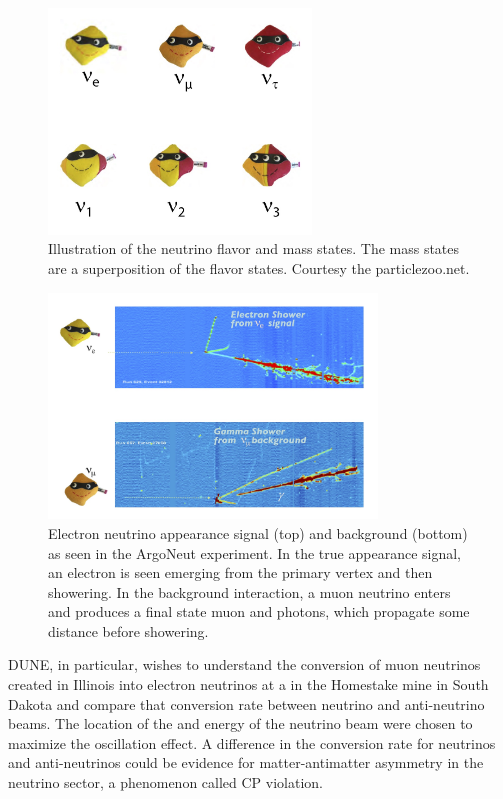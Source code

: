 \begin{figure}[h]
    \centering
\includegraphics[height=6cm]{graphics/IntroFigures/Fig_01_neutrinos.jpg}
    \caption{Illustration of the neutrino flavor and mass states.  The mass states are a superposition of the flavor states.  Courtesy the particlezoo.net.}
    \label{fig:neutrinos}
\end{figure}

\begin{figure}[h]
    \centering
\includegraphics[trim={0cm 0.6cm 2.5cm 0.7cm},clip,height=6cm]{graphics/IntroFigures/Fig_02_Argoneut.jpg}    \caption{Electron neutrino appearance signal (top) and background (bottom) as seen in the ArgoNeut experiment.  In the true appearance signal, an electron is seen emerging from the primary vertex and then showering.  In the background interaction, a muon neutrino enters and  produces a final state muon and photons, which propagate some distance before showering.}
    \label{fig:Argoneut}
\end{figure}

DUNE,  in particular,   wishes to understand the conversion of muon neutrinos created in Illinois into electron neutrinos at a  in the Homestake mine in South Dakota and compare that conversion rate between neutrino and anti-neutrino beams. The location of the  and energy of the neutrino beam were chosen to maximize the oscillation effect.   A difference in the conversion rate for neutrinos and anti-neutrinos could be evidence for matter-antimatter asymmetry in the neutrino sector, a phenomenon called CP violation.  

